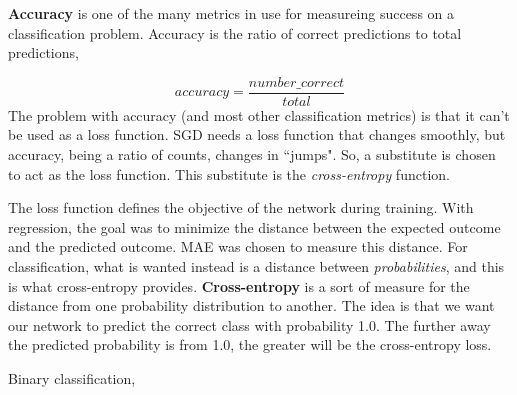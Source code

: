 \noindent \textbf{Accuracy} is one of the many metrics in use for measureing success on a
classification problem. Accuracy is the ratio of correct predictions to total predictions,

\begin{equation}
	accuracy = \frac{number\_correct}{total}
	\label{eq:1}
\end{equation}
\noindent The problem with accuracy (and most other classification metrics) is that it can't
be used as a loss function. SGD needs a loss function that changes smoothly, but accuracy,
being a ratio of counts, changes in ``jumps". So, a substitute is chosen to act as the loss
function. This substitute is the \emph{cross-entropy} function.

\noindent The loss function defines the objective of the network during training. With
regression, the goal was to minimize the distance between the expected outcome and the 
predicted outcome. MAE was chosen to measure this distance. For classification, what is
wanted instead is a distance between \emph{probabilities}, and this is what cross-entropy
provides. \textbf{Cross-entropy} is a sort of measure for the distance from one probability
distribution to another. The idea is that we want our network to predict the correct class
with probability 1.0. The further away the predicted probability is from 1.0, the greater
will be the cross-entropy loss.

\vspace{0.5cm}

\noindent Binary classification,

